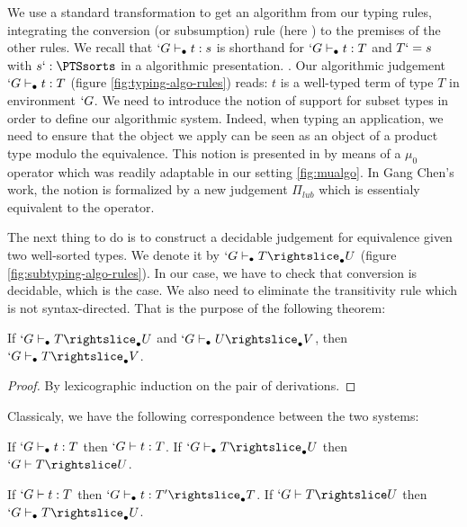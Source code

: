 \documentclass{llncs}
\begin{document}
\begin{paragraph}{}
We use a standard transformation to get an algorithm from our typing
rules, integrating the conversion (or subsumption) rule
(here ) to the premises of the other rules.
We recall that $`G \vdash_{\bullet} t : s$ is shorthand for $`G \vdash_{\bullet} t : T$ and
$T `= s$ with $s `: \PTSsorts$ in a algorithmic presentation.
. Our algorithmic judgement $`G \vdash_{\bullet} t : T$
(figure \vref{fig:typing-algo-rules})
reads: $t$ is a well-typed term of type $T$ in environment $`G$.
We need to introduce the notion of support for subset types in order to
define our algorithmic system. Indeed, when typing an application, 
we need to ensure that the object we apply can be seen as an object of a
product type modulo the equivalence. This notion is presented in \PVS{} by
means of a $\mu_0$ operator which was readily adaptable in our setting
\ref{fig:mualgo}. In Gang Chen's work, the notion is formalized by a
new judgement $\Pi_{lub}$ which is essentialy equivalent to the operator.
\end{paragraph}
\begin{paragraph}{}
  The next thing to do is to construct a decidable judgement for
  equivalence given two well-sorted types. We denote it by $`G \typea T
  \suba U$ (figure \ref{fig:subtyping-algo-rules}).
  In our case, we have to check that conversion is decidable, which is the
  case. We also need to eliminate the transitivity rule which is not
  syntax-directed. That is the purpose of the following theorem:
\begin{theorem}
  If $`G \typea T \suba U$ and $`G \typea U \suba V$, then $`G \typea T
  \suba V$.
\end{theorem}
\begin{proof}
  By lexicographic induction on the pair of derivations.
\end{proof}
\end{paragraph}

Classicaly, we have the following correspondence between the two
systems:
\begin{theorem}[Soundness]
  If $`G \vdash_{\bullet} t : T$ then $`G \vdash t : T$.
  If $`G \typea T \suba U$ then $`G \typed T \subd U$.
\end{theorem}

\begin{theorem}[Completeness]
  If $`G \vdash t : T$ then $`G \typea t : T' \suba T$.
  If $`G \typed T \subd U$ then $`G \typea T \suba U$.
\end{theorem}
\end{document}
